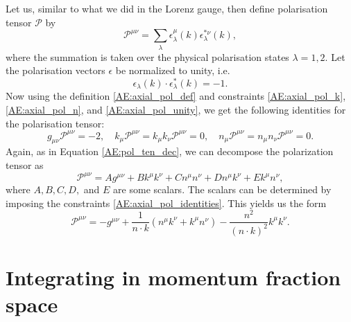 \documentclass[a4paper, twoside, english, 12pt]{report}
\begin{document}
Let us, similar to what we did in the Lorenz gauge, then define polarisation tensor $\mathcal{P}$ by
\begin{equation}\label{AE:axial_pol_def}
	\mathcal{P}^{\mu\nu} = \sum\limits_{\lambda} \epsilon^\mu_\lambda(k)\epsilon^{*\nu}_\lambda(k),
\end{equation}
where the summation is taken over the physical polarisation states $\lambda=1,2$. Let the polarisation vectors $\epsilon$ be normalized to unity, i.e.
\begin{equation}\label{AE:axial_pol_unity}
	\epsilon_\lambda(k)\cdot \epsilon^{*}_\lambda(k)=-1.
\end{equation}
Now using the definition \eqref{AE:axial_pol_def} and constraints \eqref{AE:axial_pol_k}, \eqref{AE:axial_pol_n}, and \eqref{AE:axial_pol_unity}, we get the following identities for the polarisation tensor:
\begin{equation}\label{AE:axial_pol_identities}
	g_{\mu\nu}\mathcal{P}^{\mu\nu}=-2, \quad k_{\mu}\mathcal{P}^{\mu\nu}=k_{\mu}k_{\nu}\mathcal{P}^{\mu\nu}= 0 , \quad n_{\mu}\mathcal{P}^{\mu\nu}=n_{\mu}n_{\nu}\mathcal{P}^{\mu\nu}= 0 .
\end{equation}
Again, as in Equation \eqref{AE:pol_ten_dec}, we can decompose the polarization tensor as
\begin{equation}
	\mathcal{P}^{\mu\nu} = Ag^{\mu\nu} + Bk^{\mu}k^{\nu}+ Cn^{\mu}n^{\nu} + Dn^{\mu}k^{\nu} + Ek^{\mu}n^{\nu},
\end{equation}
where $A,B,C,D,$ and $E$ are some scalars. The scalars can be determined by imposing the constraints \eqref{AE:axial_pol_identities}. This yields us the form
\begin{equation}
\mathcal{P}^{\mu\nu} = -g^{\mu\nu} + \frac{1}{n\cdot k}\left(n^{\mu}k^{\nu} + k^{\mu}n^{\nu}\right) - \frac{n^2}{\left(n\cdot k\right)^2}k^{\mu}k^{\nu}.
\end{equation}



\cleardoublepage
\chapter{Integrating in momentum fraction space}\label{A:x-space}
\end{document}
